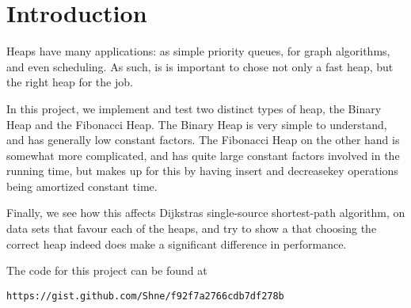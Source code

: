 \section{Introduction}

Heaps have many applications: as simple priority queues, for graph algorithms, and even scheduling. As such, is is important to chose not only a fast heap, but the right heap for the job.

In this project, we implement and test two distinct types of heap, the Binary Heap and the Fibonacci Heap. The Binary Heap is very simple to understand, and has generally low constant factors. The Fibonacci Heap on the other hand is somewhat more complicated, and has quite large constant factors involved in the running time, but makes up for this by having insert and decreasekey operations being amortized constant time.

Finally, we see how this affects Dijkstras single-source shortest-path algorithm, on data sets that favour each of the heaps, and try to show a that choosing the correct heap indeed does make a significant difference in performance. 

The code for this project can be found at

\texttt{https://gist.github.com/Shne/f92f7a2766cdb7df278b}